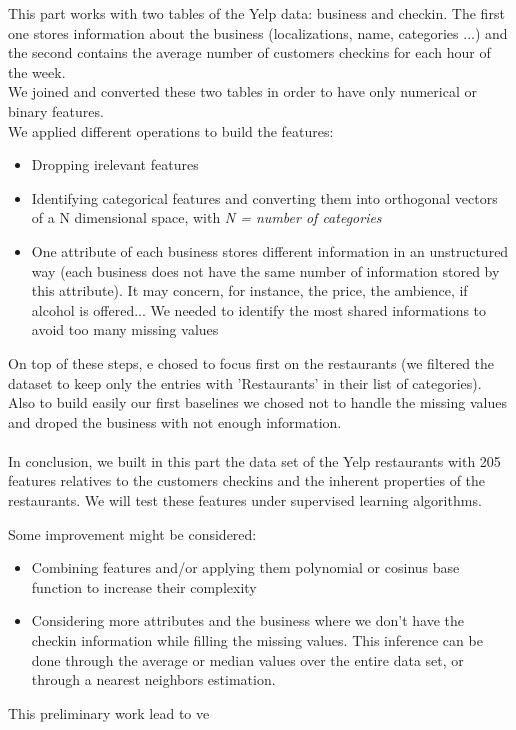 \documentclass[submit]{harvardml}
\begin{document}
This part works with two tables of the Yelp data: business and checkin. The first one stores information about the business (localizations, name, categories ...) and the second contains the average number of customers checkins for each hour of the week.\\
We joined and converted these two tables in order to have only numerical or binary features.\\
We applied different operations to build the features:
\begin{itemize}
	\item Dropping irelevant features
	\item Identifying categorical features and converting them into orthogonal vectors of a N dimensional space, with  \textit{N = number of categories}
	\item One attribute of each business stores different information in an unstructured way (each business does not have the same number of information stored by this attribute). It may concern, for instance, the price, the ambience, if alcohol is offered... We needed to identify the most shared informations to avoid too many missing values
\end{itemize}
On top of these steps, e chosed to focus first on the restaurants (we filtered the dataset to keep only the entries with 'Restaurants' in their list of categories). Also to build easily our first baselines we chosed not to handle the missing values and droped the business with not enough information.\\\\

In conclusion, we built in this part the data set of the Yelp restaurants with 205 features relatives to the customers checkins and the inherent properties of the restaurants. We will test these features under supervised learning algorithms.

Some improvement might be considered:
\begin{itemize}
	\item Combining features and/or applying them polynomial or cosinus base function to increase their complexity
	\item Considering more attributes and the business where we don't have the checkin information while filling the missing values. This inference can be done through the average or median values over the entire data set, or through a nearest neighbors estimation.
\end{itemize}

This preliminary work lead to ve
\end{document}
